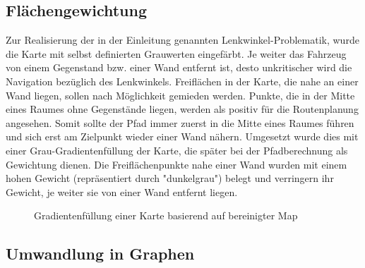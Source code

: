\subsection{Flächengewichtung}
\label{sec:gewichtung}

Zur Realisierung der in der Einleitung genannten Lenkwinkel-Problematik, wurde die Karte mit selbst definierten Grauwerten eingefärbt. Je weiter das Fahrzeug von einem Gegenstand bzw. einer Wand entfernt ist, desto unkritischer wird die Navigation bezüglich des Lenkwinkels.
Freiflächen in der Karte, die nahe an einer Wand liegen, sollen nach Möglichkeit gemieden werden. Punkte, die in der Mitte eines Raumes ohne Gegenstände liegen, werden als positiv für die Routenplanung angesehen. 
Somit sollte der Pfad immer zuerst in die Mitte eines Raumes führen und sich erst am Zielpunkt wieder einer Wand nähern. 
Umgesetzt wurde dies mit einer Grau-Gradientenfüllung der Karte, die später bei der Pfadberechnung als Gewichtung dienen. Die Freiflächenpunkte nahe einer Wand wurden mit einem hohen Gewicht (repräsentiert durch "dunkelgrau") belegt und verringern ihr Gewicht, je weiter sie von einer Wand entfernt liegen. 

\begin{figure}
\caption{Gradientenfüllung einer Karte basierend auf bereinigter Map}
\end{figure}



\subsection{Umwandlung in Graphen}

